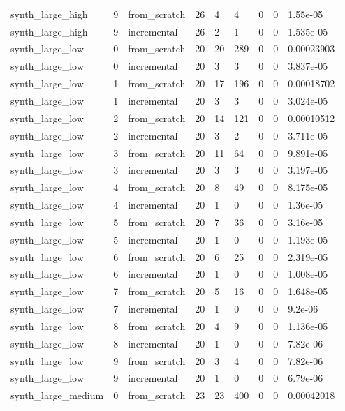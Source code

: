 \begin{table}[t]
\begin{tabular}{lllllllll}
synth\_large\_high & 9 & from\_scratch & 26 & 4 & 4 & 0 & 0 & 1.55e-05 \\
synth\_large\_high & 9 & incremental & 26 & 2 & 1 & 0 & 0 & 1.535e-05 \\
synth\_large\_low & 0 & from\_scratch & 20 & 20 & 289 & 0 & 0 & 0.00023903 \\
synth\_large\_low & 0 & incremental & 20 & 3 & 3 & 0 & 0 & 3.837e-05 \\
synth\_large\_low & 1 & from\_scratch & 20 & 17 & 196 & 0 & 0 & 0.00018702 \\
synth\_large\_low & 1 & incremental & 20 & 3 & 3 & 0 & 0 & 3.024e-05 \\
synth\_large\_low & 2 & from\_scratch & 20 & 14 & 121 & 0 & 0 & 0.00010512 \\
synth\_large\_low & 2 & incremental & 20 & 3 & 2 & 0 & 0 & 3.711e-05 \\
synth\_large\_low & 3 & from\_scratch & 20 & 11 & 64 & 0 & 0 & 9.891e-05 \\
synth\_large\_low & 3 & incremental & 20 & 3 & 3 & 0 & 0 & 3.197e-05 \\
synth\_large\_low & 4 & from\_scratch & 20 & 8 & 49 & 0 & 0 & 8.175e-05 \\
synth\_large\_low & 4 & incremental & 20 & 1 & 0 & 0 & 0 & 1.36e-05 \\
synth\_large\_low & 5 & from\_scratch & 20 & 7 & 36 & 0 & 0 & 3.16e-05 \\
synth\_large\_low & 5 & incremental & 20 & 1 & 0 & 0 & 0 & 1.193e-05 \\
synth\_large\_low & 6 & from\_scratch & 20 & 6 & 25 & 0 & 0 & 2.319e-05 \\
synth\_large\_low & 6 & incremental & 20 & 1 & 0 & 0 & 0 & 1.008e-05 \\
synth\_large\_low & 7 & from\_scratch & 20 & 5 & 16 & 0 & 0 & 1.648e-05 \\
synth\_large\_low & 7 & incremental & 20 & 1 & 0 & 0 & 0 & 9.2e-06 \\
synth\_large\_low & 8 & from\_scratch & 20 & 4 & 9 & 0 & 0 & 1.136e-05 \\
synth\_large\_low & 8 & incremental & 20 & 1 & 0 & 0 & 0 & 7.82e-06 \\
synth\_large\_low & 9 & from\_scratch & 20 & 3 & 4 & 0 & 0 & 7.82e-06 \\
synth\_large\_low & 9 & incremental & 20 & 1 & 0 & 0 & 0 & 6.79e-06 \\
synth\_large\_medium & 0 & from\_scratch & 23 & 23 & 400 & 0 & 0 & 0.00042018 \\

\end{tabular}
\end{table}

